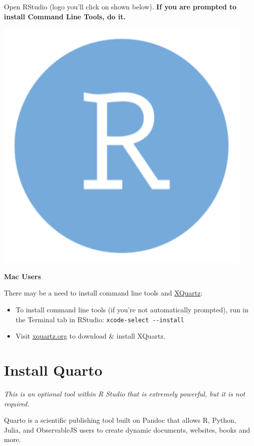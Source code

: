 \documentclass[
]{book}
\begin{document}
Open RStudio (logo you'll click on shown below). \textbf{If you are prompted to install Command Line Tools, do it.}

\begin{center}\includegraphics[width=4.97in]{images/rstudio} \end{center}

\textbf{Mac Users}

There may be a need to install command line tools and \href{https://www.xquartz.org/}{XQuartz}:

\begin{itemize}
\item
  To install command line tools (if you're not automatically prompted), run in the Terminal tab in RStudio: \texttt{xcode-select\ -\/-install}
\item
  Visit \href{https://www.xquartz.org/}{xquartz.org} to download \& install XQuartz.
\end{itemize}

\hypertarget{install-quarto}{%
\section{Install Quarto}\label{install-quarto}}

\emph{This is an optional tool within R Studio that is extremely powerful, but it is not required.}

Quarto is a scientific publishing tool built on Pandoc that allows R, Python, Julia, and ObservableJS users to create dynamic documents, websites, books and more.
\end{document}
